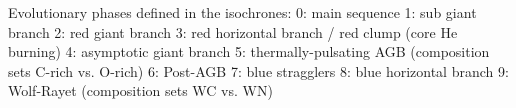 Evolutionary phases defined in the isochrones:
0: main sequence
1: sub giant branch
2: red giant branch
3: red horizontal branch / red clump (core He burning)
4: asymptotic giant branch
5: thermally-pulsating AGB (composition sets C-rich vs. O-rich)
6: Post-AGB
7: blue stragglers
8: blue horizontal branch
9: Wolf-Rayet (composition sets WC vs. WN)

